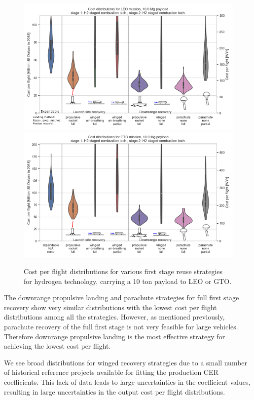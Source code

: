\documentclass[conf]{new-aiaa}
\begin{document}
\begin{multicols}{2}
\begin{figure}
    \centering
    \includegraphics[width=\textwidth]{strategy_cost_annotated/LEO_H2}
     \includegraphics[width=\textwidth]{strategy_cost_annotated/GTO_H2}
    \caption{\label{fig:strategy_cost_H2} Cost per flight distributions for various first stage reuse strategies for hydrogen technology, carrying a 10 ton payload to LEO or GTO.}
\end{figure}

The downrange propulsive landing and parachute strategies for full first stage recovery show very similar distributions with the lowest cost per flight distributions among all the strategies. However, as mentioned previously, parachute recovery of the full first stage is not very feasible for large vehicles. Therefore downrange propulsive landing is the most effective strategy for achieving the lowest cost per flight. 

We see broad distributions for winged recovery strategies due to a small number of historical reference projects available for fitting the production CER coefficients. This lack of data leads to large uncertainties in the coefficient values, resulting in large uncertainties in the output cost per flight distributions. 


\end{multicols}
\end{document}
